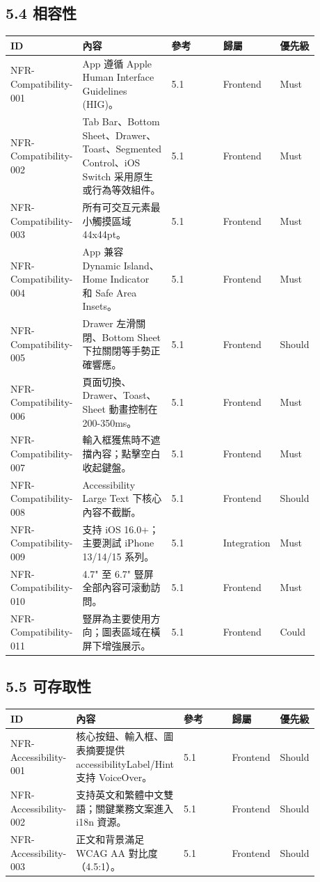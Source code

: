 \subsection{5.4 相容性}

\begingroup
\small
\begin{longtable}{L{0.18\linewidth}L{0.30\linewidth}L{0.18\linewidth}L{0.12\linewidth}L{0.10\linewidth}}
\toprule
\textbf{ID} & \textbf{內容} & \textbf{參考} & \textbf{歸屬} & \textbf{優先級} \\
\midrule
NFR-Compatibility-001 & App 遵循 Apple Human Interface Guidelines (HIG)。 & 5.1 & Frontend & Must \\
NFR-Compatibility-002 & Tab Bar、Bottom Sheet、Drawer、Toast、Segmented Control、iOS Switch 采用原生或行為等效組件。 & 5.1 & Frontend & Must \\
NFR-Compatibility-003 & 所有可交互元素最小觸摸區域 44x44pt。 & 5.1 & Frontend & Must \\
NFR-Compatibility-004 & App 兼容 Dynamic Island、Home Indicator 和 Safe Area Insets。 & 5.1 & Frontend & Must \\
NFR-Compatibility-005 & Drawer 左滑關閉、Bottom Sheet 下拉關閉等手勢正確響應。 & 5.1 & Frontend & Should \\
NFR-Compatibility-006 & 頁面切換、Drawer、Toast、Sheet 動畫控制在 200-350ms。 & 5.1 & Frontend & Must \\
NFR-Compatibility-007 & 輸入框獲焦時不遮擋內容；點擊空白收起鍵盤。 & 5.1 & Frontend & Must \\
NFR-Compatibility-008 & Accessibility Large Text 下核心內容不截斷。 & 5.1 & Frontend & Should \\
NFR-Compatibility-009 & 支持 iOS 16.0+；主要測試 iPhone 13/14/15 系列。 & 5.1 & Integration & Must \\
NFR-Compatibility-010 & 4.7" 至 6.7" 豎屏全部內容可滚動訪問。 & 5.1 & Frontend & Must \\
NFR-Compatibility-011 & 豎屏為主要使用方向；圖表區域在橫屏下增強展示。 & 5.1 & Frontend & Could \\
\bottomrule
\end{longtable}
\endgroup

\subsection{5.5 可存取性}

\begingroup
\small
\begin{longtable}{L{0.18\linewidth}L{0.30\linewidth}L{0.18\linewidth}L{0.12\linewidth}L{0.10\linewidth}}
\toprule
\textbf{ID} & \textbf{內容} & \textbf{參考} & \textbf{歸屬} & \textbf{優先級} \\
\midrule
NFR-Accessibility-001 & 核心按鈕、輸入框、圖表摘要提供 accessibilityLabel/Hint 支持 VoiceOver。 & 5.1 & Frontend & Should \\
NFR-Accessibility-002 & 支持英文和繁體中文雙語；關鍵業務文案進入 i18n 資源。 & 5.1 & Frontend & Should \\
NFR-Accessibility-003 & 正文和背景滿足 WCAG AA 對比度（4.5:1）。 & 5.1 & Frontend & Should \\
\bottomrule
\end{longtable}
\endgroup


